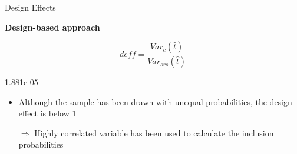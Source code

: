 \documentclass[11pt,german,hideothersubsections]{beamer}
\begin{document}
\begin{frame}[fragile]{Design Effects}
\footnotesize{
\begin{center}
\textbf{Design-based approach}
\end{center}
\begin{equation*}
deff=\frac{Var_c(\hat{t})}{Var_{srs}(\hat{t})}
\end{equation*}

\begin{Schunk}
\begin{Soutput}
          [,1]
[1,] 1.881e-05
\end{Soutput}
\end{Schunk}
\begin{itemize}
\item Although the sample has been drawn with unequal probabilities, the design effect is below 1
\item[$\Rightarrow$] Highly correlated variable has been used to calculate the inclusion probabilities 
\end{itemize}

}
\end{frame}
\end{document}
